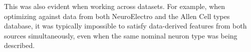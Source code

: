 This was also evident when working across datasets.
For example, when optimizing against data from both NeuroElectro and the Allen Cell types database, it was typically impossible to satisfy data-derived features from both sources simultaneously, even when the same nominal neuron type was being described.


%



